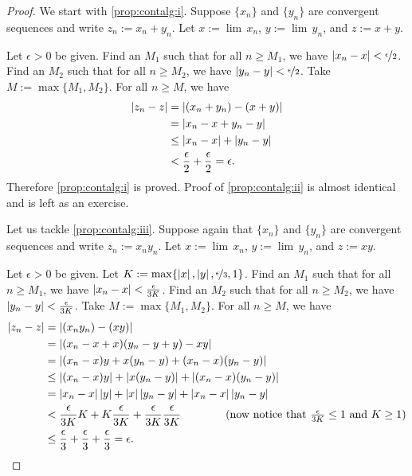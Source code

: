 \begin{proof}
We start with \ref{prop:contalg:i}.
Suppose $\{ x_n \}$ and $\{ y_n \}$ are convergent sequences and
write $z_n := x_n + y_n$.  Let $x := \lim\, x_n$,
$y := \lim\, y_n$, and $z := x+y$.

Let $\epsilon > 0$ be given.  
Find an $M_1$ such that for all $n \geq M_1$,
we have
$\left\lvert {x_n - x} \right\rvert < \nicefrac{\epsilon}{2}$.  
Find an $M_2$ such that for all $n \geq M_2$,
we have
$\left\lvert {y_n - y} \right\rvert < \nicefrac{\epsilon}{2}$.  Take $M := \max \{ M_1, M_2 \}$.
For all $n \geq M$, we have
\begin{equation*}
\begin{split}
\left\lvert {z_n - z} \right\rvert &=
\left\lvert {(x_n+y_n) - (x+y)} \right\rvert \\
& =
\left\lvert {x_n-x + y_n-y} \right\rvert \\
& \leq
\left\lvert {x_n-x} \right\rvert + \left\lvert {y_n-y} \right\rvert \\
& <
\frac{\epsilon}{2} +
\frac{\epsilon}{2}
= \epsilon.
\end{split}
\end{equation*}
Therefore \ref{prop:contalg:i} is proved.
Proof of \ref{prop:contalg:ii} is almost identical and is left as an
exercise.

Let us tackle 
\ref{prop:contalg:iii}.
Suppose again that $\{ x_n \}$ and $\{ y_n \}$ are convergent sequences and
write $z_n := x_n y_n$.  Let $x := \lim\, x_n$,
$y := \lim\, y_n$, and $z := xy$.

Let $\epsilon > 0$ be given.
Let $K := \max\{ \left\lvert {x} \right\rvert, \left\lvert {y} \right\rvert, \nicefrac{\epsilon}{3} , 1 \}$.
Find an $M_1$ such that for all $n \geq M_1$,
we have
$\left\lvert {x_n - x} \right\rvert < \frac{\epsilon}{3K}$.
Find an $M_2$ such that for all $n \geq M_2$,
we have
$\left\lvert {y_n - y} \right\rvert < \frac{\epsilon}{3K}$.  Take $M := \max \{ M_1, M_2 \}$.
For all $n \geq M$, we have
\begin{equation*}
\begin{split}
\left\lvert {z_n - z} \right\rvert &=
\left\lvert {(x_ny_n) - (xy)} \right\rvert \\
& =
\left\lvert {(x_n-x+x)(y_n-y+y) - xy} \right\rvert \\
& =
\left\lvert {(x_n-x)y + x(y_n-y) +(x_n-x)(y_n-y)} \right\rvert \\
& \leq
\left\lvert {(x_n-x)y} \right\rvert + \left\lvert {x(y_n - y)} \right\rvert +
\left\lvert {(x_n-x)(y_n-y)} \right\rvert \\
& =
\left\lvert {x_n -x} \right\rvert\left\lvert {y} \right\rvert + 
\left\lvert {x} \right\rvert\left\lvert {y_n -y} \right\rvert + 
\left\lvert {x_n -x} \right\rvert\left\lvert {y_n -y} \right\rvert
\\
& <
\frac{\epsilon}{3K} K + 
K \frac{\epsilon}{3K} + 
\frac{\epsilon}{3K}
\frac{\epsilon}{3K}
\qquad \qquad \text{(now notice that } \tfrac{\epsilon}{3K} \leq 1
\text{ and }
K \geq 1\text{)}
\\
& \leq
\frac{\epsilon}{3} + \frac{\epsilon}{3} + \frac{\epsilon}{3}
 = \epsilon .
\end{split}
\end{equation*}


\end{proof}
